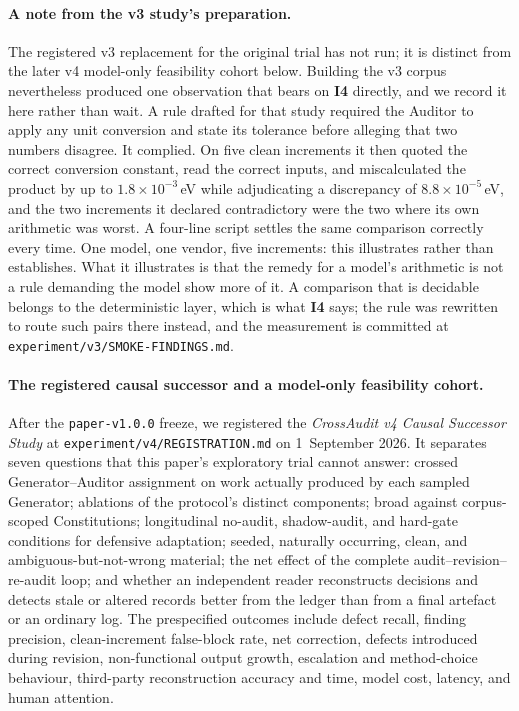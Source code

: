 \documentclass[11pt]{article}
\newcommand{\invariant}[1]{\textbf{I#1}}
\begin{document}
\paragraph{A note from the v3 study's preparation.} The registered v3 replacement for the original trial has not run; it is distinct from the later v4 model-only feasibility cohort below. Building the v3 corpus nevertheless produced one observation that bears on \invariant{4} directly, and we record it here rather than wait. A rule drafted for that study required the Auditor to apply any unit conversion and state its tolerance before alleging that two numbers disagree. It complied. On five clean increments it then quoted the correct conversion constant, read the correct inputs, and miscalculated the product by up to $1.8\times10^{-3}$\,eV while adjudicating a discrepancy of $8.8\times10^{-5}$\,eV, and the two increments it declared contradictory were the two where its own arithmetic was worst. A four-line script settles the same comparison correctly every time. One model, one vendor, five increments: this illustrates rather than establishes. What it illustrates is that the remedy for a model's arithmetic is not a rule demanding the model show more of it. A comparison that is decidable belongs to the deterministic layer, which is what \invariant{4} says; the rule was rewritten to route such pairs there instead, and the measurement is committed at \texttt{experiment/v3/SMOKE-FINDINGS.md}.

\paragraph{The registered causal successor and a model-only feasibility cohort.}\label{sec:successor} After the \texttt{paper-v1.0.0} freeze, we registered the \emph{CrossAudit v4 Causal Successor Study} at \texttt{experiment/v4/REGISTRATION.md} on 1~September 2026. It separates seven questions that this paper's exploratory trial cannot answer: crossed Generator--Auditor assignment on work actually produced by each sampled Generator; ablations of the protocol's distinct components; broad against corpus-scoped Constitutions; longitudinal no-audit, shadow-audit, and hard-gate conditions for defensive adaptation; seeded, naturally occurring, clean, and ambiguous-but-not-wrong material; the net effect of the complete audit--revision--re-audit loop; and whether an independent reader reconstructs decisions and detects stale or altered records better from the ledger than from a final artefact or an ordinary log. The prespecified outcomes include defect recall, finding precision, clean-increment false-block rate, net correction, defects introduced during revision, non-functional output growth, escalation and method-choice behaviour, third-party reconstruction accuracy and time, model cost, latency, and human attention.
\end{document}
